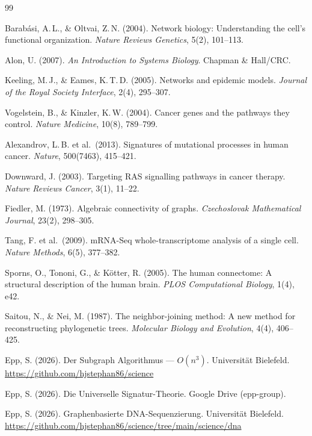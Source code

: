 ﻿\documentclass[a4paper,12pt]{article}
\theoremstyle{plain}
\theoremstyle{definition}
\theoremstyle{remark}
\begin{document}
\begin{thebibliography}{99}

Barab\'asi, A.\,L., \& Oltvai, Z.\,N. (2004).
Network biology: Understanding the cell's functional organization.
\textit{Nature Reviews Genetics}, 5(2), 101--113.

Alon, U. (2007).
\textit{An Introduction to Systems Biology}.
Chapman \& Hall/CRC.

Keeling, M.\,J., \& Eames, K.\,T.\,D. (2005).
Networks and epidemic models.
\textit{Journal of the Royal Society Interface}, 2(4), 295--307.

Vogelstein, B., \& Kinzler, K.\,W. (2004).
Cancer genes and the pathways they control.
\textit{Nature Medicine}, 10(8), 789--799.

Alexandrov, L.\,B. et al.\ (2013).
Signatures of mutational processes in human cancer.
\textit{Nature}, 500(7463), 415--421.

Downward, J. (2003).
Targeting RAS signalling pathways in cancer therapy.
\textit{Nature Reviews Cancer}, 3(1), 11--22.

Fiedler, M. (1973).
Algebraic connectivity of graphs.
\textit{Czechoslovak Mathematical Journal}, 23(2), 298--305.

Tang, F. et al.\ (2009).
mRNA-Seq whole-transcriptome analysis of a single cell.
\textit{Nature Methods}, 6(5), 377--382.

Sporns, O., Tononi, G., \& K\"otter, R. (2005).
The human connectome: A structural description of the human brain.
\textit{PLOS Computational Biology}, 1(4), e42.

Saitou, N., \& Nei, M. (1987).
The neighbor-joining method: A new method for reconstructing phylogenetic trees.
\textit{Molecular Biology and Evolution}, 4(4), 406--425.

Epp, S. (2026).
Der Subgraph Algorithmus --- $O(n^3)$.
Universit\"at Bielefeld.
\url{https://github.com/hjstephan86/science}

Epp, S. (2026).
Die Universelle Signatur-Theorie.
Google Drive (epp-group).

Epp, S. (2026).
Graphenbasierte DNA-Sequenzierung.
Universit\"at Bielefeld.
\url{https://github.com/hjstephan86/science/tree/main/science/dna}


\end{thebibliography}
\end{document}
